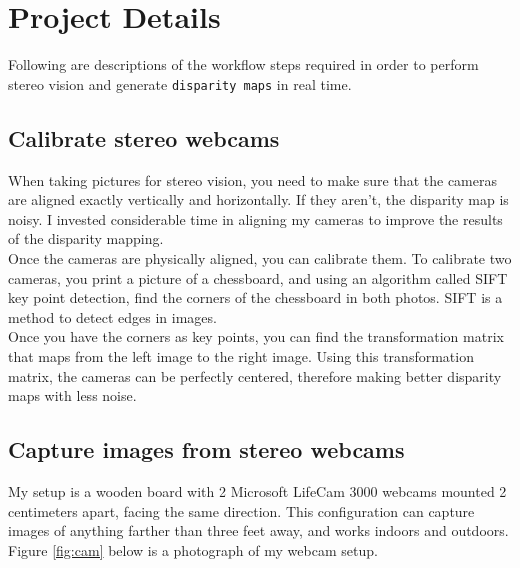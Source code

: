 \documentclass[11pt,fleqn]{article}
\begin{document}
\section{Project Details}

Following are descriptions of the workflow steps required in order to perform stereo vision and generate \texttt{disparity maps} in real time.

\subsection{Calibrate stereo webcams}
When taking pictures for stereo vision, you need to make sure that the cameras are aligned exactly vertically and horizontally. If they aren't, the disparity map is noisy. I invested considerable time in aligning my cameras to improve the results of the disparity mapping.\\[5pt]
%
Once the cameras are physically aligned, you can calibrate them. To calibrate two cameras, you print a picture of a chessboard, and using an algorithm called SIFT key point detection, find the corners of the chessboard in both photos. SIFT is a method to detect edges in images. \\[5pt]
%
\newpage
Once you have the corners as key points, you can find the transformation matrix that maps from the left image to the right image. Using this transformation matrix, the cameras can be perfectly centered, therefore making better disparity maps with less noise.

\subsection{Capture images from stereo webcams}
My setup is a wooden board with 2 Microsoft LifeCam 3000 webcams mounted 2 centimeters apart, facing the same direction. This configuration can capture images of anything farther than three feet away, and works indoors and outdoors. Figure \ref{fig:cam} below is a photograph of my webcam setup.\\
\end{document}
